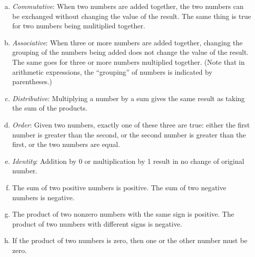 \begin{enumerate}[(a)]
\item
\emph{Commutative}: When two numbers are added together, the two numbers can be exchanged without changing the value of the result. The same thing is true for two numbers being mulitiplied together.
\item
\emph{Associative}: When three or more numbers are added together, changing the grouping of the numbers being added does not change the value of the result.   The same goes for three or more numbers multiplied together. (Note that in arithmetic expressions, the ``grouping'' of numbers is indicated by parentheses.)
\item
\emph{Distributive}:   Multiplying a number by a sum gives the same result as taking the sum of the products.
\item
\emph{Order}:   Given two numbers, exactly one of these three are true: either the first number is greater than the second, or the second number is greater than the first, or the two numbers are equal.
\item
\emph{Identity}:   Addition by 0 or multiplication by 1 result in no change of original number.
\item
The sum of two  positive numbers  is positive. The sum of two negative numbers is negative.
\item
The product of two  nonzero numbers with the same sign is positive. The product of two numbers with different signs is negative.
\item
If  the product of two numbers is zero, then one or the other number must be zero.
\end {enumerate}


